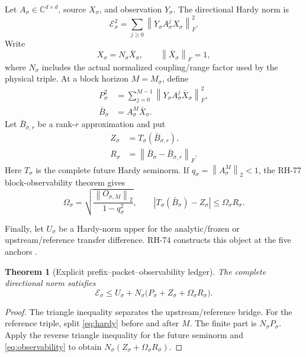 \documentclass[11pt]{article}
\newtheorem{theorem}{Theorem}[section]
\theoremstyle{definition}
\theoremstyle{remark}
\newcommand{\norm}[1]{\left\lVert#1\right\rVert}
\begin{document}
Let $A_\sigma\in\mathbb C^{d\times d}$, source $X_\sigma$, and observation
$Y_\sigma$.  The directional Hardy norm is
\begin{equation}
 \mathcal E_\sigma^2
 =\sum_{j\ge0}\norm{Y_\sigma A_\sigma^jX_\sigma}_F^2.
 \label{eq:hardy}
\end{equation}
Write
\[
 X_\sigma=N_\sigma\bar X_\sigma,
 \qquad \norm{\bar X_\sigma}_F=1,
\]
where $N_\sigma$ includes the actual normalized coupling/range factor used by
the physical triple.  At a block horizon $M=M_\sigma$, define
\begin{align}
 P_\sigma^2
 &=\sum_{j=0}^{M-1}
   \norm{Y_\sigma A_\sigma^j\bar X_\sigma}_F^2,
 \label{eq:prefix}\\
 \bar B_\sigma&=A_\sigma^M\bar X_\sigma.
\end{align}
Let $\bar B_{\sigma,r}$ be a rank-$r$ approximation and put
\begin{align}
 Z_\sigma&=T_\sigma(\bar B_{\sigma,r}),\label{eq:reduced}\\
 R_\sigma&=\norm{\bar B_\sigma-\bar B_{\sigma,r}}_F.
 \label{eq:residual}
\end{align}
Here $T_\sigma$ is the complete future Hardy seminorm.  If
$q_\sigma=\norm{A_\sigma^M}_2<1$, the RH-77 block-observability theorem gives
\begin{equation}
 \Omega_\sigma=
 \sqrt{\frac{\norm{O_{\sigma,M}}_2}{1-q_\sigma^2}},
 \qquad
 |T_\sigma(\bar B_\sigma)-Z_\sigma|
 \le\Omega_\sigma R_\sigma.
 \label{eq:observability}
\end{equation}

Finally, let $U_\sigma$ be a Hardy-norm upper for the analytic/frozen or
upstream/reference transfer difference.  RH-74 constructs this object at the
five anchors \citep{WangUpstream2026}.

\begin{theorem}[Explicit prefix--packet--observability ledger]
\label{thm:norm-ledger}
The complete directional norm satisfies
\begin{equation}
 \boxed{
 \mathcal E_\sigma
 \le U_\sigma+N_\sigma
 \bigl(P_\sigma+Z_\sigma+\Omega_\sigma R_\sigma\bigr).}
 \label{eq:norm-ledger}
\end{equation}
\end{theorem}

\begin{proof}
The triangle inequality separates the upstream/reference bridge.  For the
reference triple, split \eqref{eq:hardy} before and after $M$.  The finite
part is $N_\sigma P_\sigma$.  Apply the reverse triangle inequality for the
future seminorm and \eqref{eq:observability} to obtain
$N_\sigma(Z_\sigma+\Omega_\sigma R_\sigma)$.
\end{proof}
\end{document}
